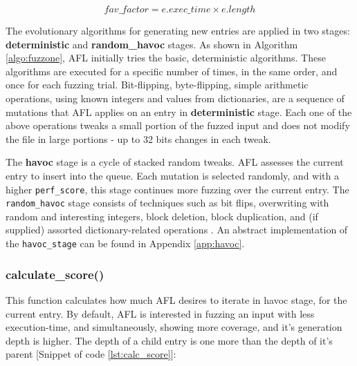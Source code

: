 \begin{equation}
    fav\_factor = e.exec\_time \times e.length
    \label{eq:afl_fav_fac}
\end{equation}


The evolutionary algorithms for generating new entries are applied in two stages: \textbf{deterministic} and \textbf{random\_havoc} stages. As shown in Algorithm \ref{algo:fuzzone}, AFL initially tries the basic, deterministic algorithms. These algorithms are executed for a specific number of times, in the same order, and once for each fuzzing trial. Bit-flipping, byte-flipping, simple arithmetic operations, using known integers and values from dictionaries, are a sequence of mutations that AFL applies on an entry in \textbf{deterministic} stage. Each one of the above operations tweaks a small portion of the fuzzed input and does not modify the file in large portions - up to 32 bits changes in each tweak.

The \textbf{havoc} stage is a cycle of stacked random tweaks. AFL assesses the current entry to insert into the queue. Each mutation is selected randomly, and with a higher \texttt{perf\_score}, this stage continues more fuzzing over the current entry. The \texttt{random\_havoc} stage consists of techniques such as bit flips, overwriting with random and interesting integers, block deletion, block duplication, and (if supplied) assorted dictionary-related operations \cite{afl_userguide}. An abstract implementation of the \texttt{havoc\_stage} can be found in Appendix \ref{app:havoc}.

\subsubsection{calculate\_score()}
\label{sub:calc_score}

This function calculates how much AFL desires to iterate in havoc stage, for the current entry. By default, AFL is interested in fuzzing an input with less execution-time, and simultaneously, showing more coverage, and it's generation depth is higher. The depth of a child entry is one more than the depth of it's parent [Snippet of code \ref{lst:calc_score}]: 

